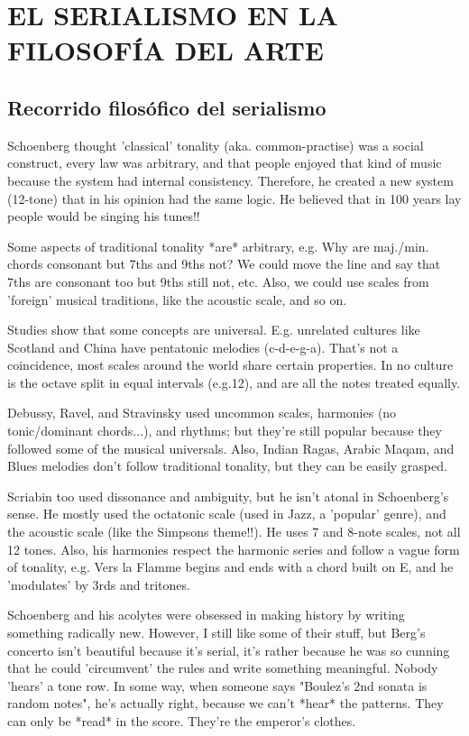 \chapter{EL SERIALISMO EN LA FILOSOFÍA DEL ARTE}\label{ch:filosofia}
    \section{Recorrido filosófico del serialismo}
    Schoenberg thought 'classical' tonality (aka. common-practise) was a social construct, every law was arbitrary, and that people enjoyed that kind of music because the system had internal consistency. Therefore, he created a new system (12-tone) that in his opinion had the same logic. He believed that in 100 years lay people would be singing his tunes!!
    
    Some aspects of traditional tonality *are* arbitrary, e.g. Why are maj./min. chords consonant but 7ths and 9ths not? We could move the line and say that 7ths are consonant too but 9ths still not, etc. Also, we could use scales from 'foreign' musical traditions, like the acoustic scale, and so on.
    
    Studies show that some concepts are universal. E.g. unrelated cultures like Scotland and China have pentatonic melodies (c-d-e-g-a). That's not a coincidence, most scales around the world share certain properties. In no culture is the octave split in equal intervals (e.g.12), and are all the notes treated equally.
    
    Debussy, Ravel, and Stravinsky used uncommon scales, harmonies (no tonic/dominant chords...), and rhythms; but they're still popular because they followed some of the musical universals. Also, Indian Ragas, Arabic Maqam, and Blues melodies don't follow traditional tonality, but they can be easily grasped.
    
    Scriabin too used dissonance and ambiguity, but he isn't atonal in Schoenberg's sense. He mostly used the octatonic scale (used in Jazz, a 'popular' genre), and the acoustic scale (like the Simpsons theme!!). He uses 7 and 8-note scales, not all 12 tones. Also, his harmonies respect the harmonic series and follow a vague form of tonality, e.g. Vers la Flamme begins and ends with a chord built on E, and he 'modulates' by 3rds and tritones.
    
    Schoenberg and his acolytes were obsessed in making history by writing something radically new. However, I still like some of their stuff, but Berg's concerto isn't beautiful because it's serial, it's rather because he was so cunning that he could 'circumvent' the rules and write something meaningful. Nobody 'hears' a tone row. In some way, when someone says "Boulez's 2nd sonata is random notes", he's actually right, because we can't *hear* the patterns. They can only be *read* in the score. They're the emperor's clothes.
    
